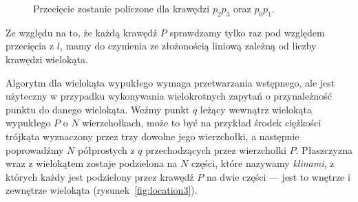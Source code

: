 \begin{figure}[htp]
  \centering
  \caption{Przecięcie zostanie policzone dla krawędzi $p_{2}p_{3}$
    oraz $p_{0}p_{1}$.}
\end{figure}

Ze względu na to, że każdą krawędź $P$ sprawdzamy tylko raz
pod względem przecięcia z $l$, mamy do czynienia ze złożonością
liniową zależną od liczby krawędzi wielokąta.

Algorytm dla wielokąta wypukłego wymaga przetwarzania wstępnego, ale
jest użyteczny w przypadku wykonywania wielokrotnych zapytań o
przynależność punktu do danego wielokąta. Weźmy punkt $q$ leżący
wewnątrz wielokąta wypukłego $P$ o $N$ wierzchołkach, może to być na
przykład środek ciężkości trójkąta wyznaczony przez trzy dowolne jego
wierzchołki, a następnie poprowadźmy $N$ półprostych z $q$
przechodzących przez wierzchołki $P$. Płaszczyzna wraz z wielokątem
zostaje podzielona na $N$ części, które nazywamy \emph{klinami}, z
których każdy jest podzielony przez krawędź $P$ na dwie części ---
jest to wnętrze i zewnętrze wielokąta (rysunek~\ref{fig:location3}).

